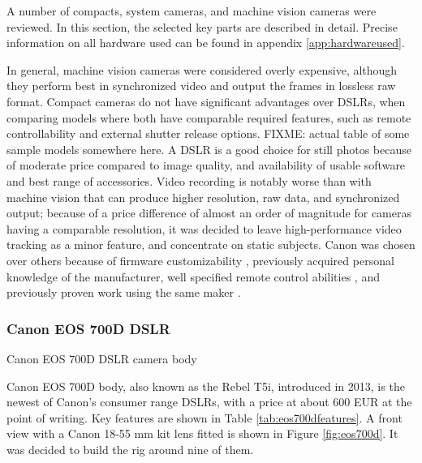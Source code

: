A number of compacts, system cameras, and machine vision cameras were reviewed.
In this section, the selected key parts are described in detail.
Precise information on all hardware used can be found in appendix \ref{app:hardwareused}.

In general, machine vision cameras were considered overly expensive, although they perform best in synchronized video and output the frames in lossless raw format.
Compact cameras do not have significant advantages over DSLRs, when comparing models where both have comparable required features, such as remote controllability and external shutter release options.
{ \color{red} FIXME: actual table of some sample models somewhere here. }
A DSLR is a good choice for still photos because of moderate price compared to image quality, and availability of usable software and best range of accessories.
Video recording is notably worse than with machine vision that can produce higher resolution, raw data, and synchronized output;
because of a price difference of almost an order of magnitude for cameras having a comparable resolution, it was decided to leave high-performance video tracking as a minor feature, and concentrate on static subjects.
Canon was chosen over others because of firmware customizability \cite{magiclantern}, previously acquired personal knowledge of the manufacturer, well specified remote control abilities \cite{canonedsdk}, and previously proven work using the same maker \cite{ir-ltd,ten24,capturelab,agisoftforum}.

\subsubsection{Canon EOS 700D DSLR}

{Canon EOS 700D DSLR camera body}

Canon EOS 700D body, also known as the Rebel T5i, introduced in 2013, is the newest of Canon's consumer range DSLRs, with a price at about 600 EUR at the point of writing.
Key features are shown in Table \ref{tab:eos700dfeatures}.
A front view with a Canon 18-55 mm kit lens fitted is shown in Figure \ref{fig:eos700d}.
It was decided to build the rig around nine of them.

